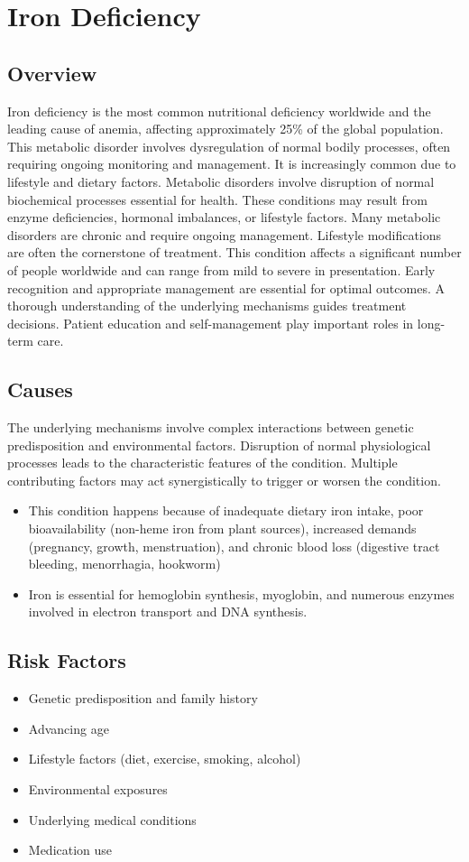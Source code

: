 \chapter{Iron Deficiency}
\label{sec:Iron Deficiency}

\section{Overview}
Iron deficiency is the most common nutritional deficiency worldwide and the leading cause of anemia, affecting approximately 25\% of the global population. This metabolic disorder involves dysregulation of normal bodily processes, often requiring ongoing monitoring and management. It is increasingly common due to lifestyle and dietary factors. Metabolic disorders involve disruption of normal biochemical processes essential for health. These conditions may result from enzyme deficiencies, hormonal imbalances, or lifestyle factors. Many metabolic disorders are chronic and require ongoing management. Lifestyle modifications are often the cornerstone of treatment. This condition affects a significant number of people worldwide and can range from mild to severe in presentation. Early recognition and appropriate management are essential for optimal outcomes. A thorough understanding of the underlying mechanisms guides treatment decisions. Patient education and self-management play important roles in long-term care.
\section{Causes}
The underlying mechanisms involve complex interactions between genetic predisposition and environmental factors. Disruption of normal physiological processes leads to the characteristic features of the condition. Multiple contributing factors may act synergistically to trigger or worsen the condition.

\begin{itemize}[noitemsep]
  \item This condition happens because of inadequate dietary iron intake, poor bioavailability (non-heme iron from plant sources), increased demands (pregnancy, growth, menstruation), and chronic blood loss (digestive tract bleeding, menorrhagia, hookworm)
  \item Iron is essential for hemoglobin synthesis, myoglobin, and numerous enzymes involved in electron transport and DNA synthesis.
\end{itemize}
\section{Risk Factors}
\begin{itemize}[noitemsep]
  \item Genetic predisposition and family history
  \item Advancing age
  \item Lifestyle factors (diet, exercise, smoking, alcohol)
  \item Environmental exposures
  \item Underlying medical conditions
  \item Medication use
\end{itemize}
